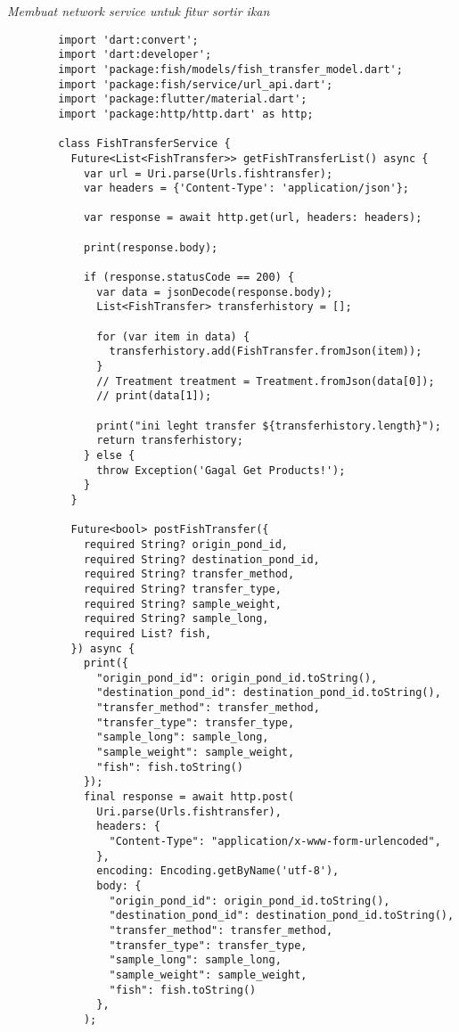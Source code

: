 	\textit{Membuat network service untuk fitur sortir ikan}
	\begin{lstlisting}
        import 'dart:convert';
        import 'dart:developer';
        import 'package:fish/models/fish_transfer_model.dart';
        import 'package:fish/service/url_api.dart';
        import 'package:flutter/material.dart';
        import 'package:http/http.dart' as http;
        
        class FishTransferService {
          Future<List<FishTransfer>> getFishTransferList() async {
            var url = Uri.parse(Urls.fishtransfer);
            var headers = {'Content-Type': 'application/json'};
        
            var response = await http.get(url, headers: headers);
        
            print(response.body);
        
            if (response.statusCode == 200) {
              var data = jsonDecode(response.body);
              List<FishTransfer> transferhistory = [];
        
              for (var item in data) {
                transferhistory.add(FishTransfer.fromJson(item));
              }
              // Treatment treatment = Treatment.fromJson(data[0]);
              // print(data[1]);
        
              print("ini leght transfer ${transferhistory.length}");
              return transferhistory;
            } else {
              throw Exception('Gagal Get Products!');
            }
          }
        
          Future<bool> postFishTransfer({
            required String? origin_pond_id,
            required String? destination_pond_id,
            required String? transfer_method,
            required String? transfer_type,
            required String? sample_weight,
            required String? sample_long,
            required List? fish,
          }) async {
            print({
              "origin_pond_id": origin_pond_id.toString(),
              "destination_pond_id": destination_pond_id.toString(),
              "transfer_method": transfer_method,
              "transfer_type": transfer_type,
              "sample_long": sample_long,
              "sample_weight": sample_weight,
              "fish": fish.toString()
            });
            final response = await http.post(
              Uri.parse(Urls.fishtransfer),
              headers: {
                "Content-Type": "application/x-www-form-urlencoded",
              },
              encoding: Encoding.getByName('utf-8'),
              body: {
                "origin_pond_id": origin_pond_id.toString(),
                "destination_pond_id": destination_pond_id.toString(),
                "transfer_method": transfer_method,
                "transfer_type": transfer_type,
                "sample_long": sample_long,
                "sample_weight": sample_weight,
                "fish": fish.toString()
              },
            );
        

\end{lstlisting}
